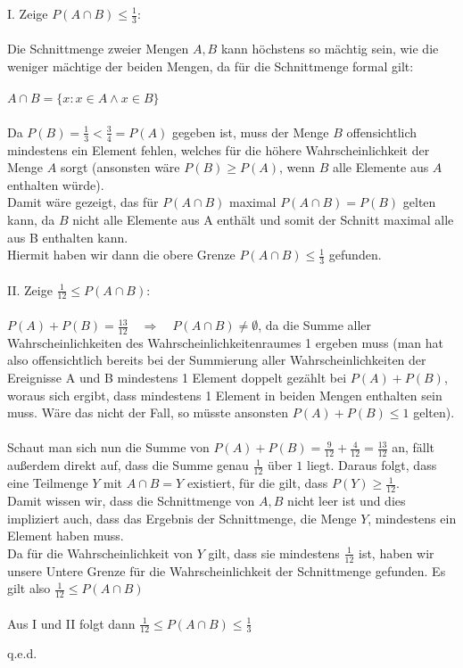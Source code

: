 \documentclass[10pt,a4paper]{article}
\begin{document}
		\begin{text}
			I. Zeige $P(A \cap B) \le \frac{1}{3}$:
			\\
			\\
			Die Schnittmenge zweier Mengen $A, B$ kann höchstens so mächtig sein, wie die weniger mächtige der beiden Mengen, da für die Schnittmenge formal gilt:
			\\
			\\
			$A \cap B  = \{ x : x \in A \wedge x \in B\}$
			\\
			\\
			Da $P(B) = \frac{1}{3} < \frac{3}{4} = P(A)$ gegeben ist, muss der Menge $B$ offensichtlich mindestens ein Element fehlen, welches für die höhere Wahrscheinlichkeit der Menge $A$ sorgt (ansonsten wäre $P(B) \ge P(A)$, wenn $B$ alle Elemente aus $A$ enthalten würde).
			\\
			Damit wäre gezeigt, das für $P(A \cap B)$ maximal $P(A \cap B) = P(B)$ gelten kann, da $B$ nicht alle Elemente aus A enthält und somit der Schnitt maximal alle aus B enthalten kann.
			\\
			Hiermit haben wir dann die obere Grenze $P(A \cap B) \le \frac{1}{3}$ gefunden.
			\\
			\\
			II. Zeige $\frac{1}{12} \le P(A \cap B)$:
			\\
			\\
			$P(A) + P(B) = \frac{13}{12} \quad \Rightarrow \quad P(A \cap B) \neq \emptyset$, da die Summe aller Wahrscheinlichkeiten des Wahrscheinlichkeitenraumes 1 ergeben muss (man hat also offensichtlich bereits bei der Summierung aller Wahrscheinlichkeiten der Ereignisse A und B mindestens 1 Element doppelt gezählt bei $P(A) + P(B)$, woraus sich ergibt, dass mindestens 1 Element in beiden Mengen enthalten sein muss. Wäre das nicht der Fall, so müsste ansonsten $P(A) + P(B) \le 1$ gelten).
			\\
			\\
			Schaut man sich nun die Summe von $P(A) + P(B) = \frac{9}{12} + \frac{4}{12} = \frac{13}{12}$ an, fällt außerdem direkt auf, dass die Summe genau $\frac{1}{12}$ über $1$ liegt. Daraus folgt, dass eine Teilmenge $Y$ mit $A \cap B = Y$ existiert, für die gilt, dass $P(Y) \ge \frac{1}{12}$.
			\\
			Damit wissen wir, dass die Schnittmenge von $A, B$ nicht leer ist und dies impliziert auch, dass das Ergebnis der Schnittmenge, die Menge $Y$, mindestens ein Element haben muss.
			\\
			Da für die Wahrscheinlichkeit von $Y$ gilt, dass sie mindestens $\frac{1}{12}$ ist, haben wir unsere Untere Grenze für die Wahrscheinlichkeit der Schnittmenge gefunden. Es gilt also $\frac{1}{12} \le P(A \cap B)$
			\\
			\\
			Aus I und II folgt dann $\frac{1}{12} \le P(A \cap B) \le \frac{1}{3}$
			\begin{flushright}
						q.e.d.
			\end{flushright}
		\end{text}
\end{document}
